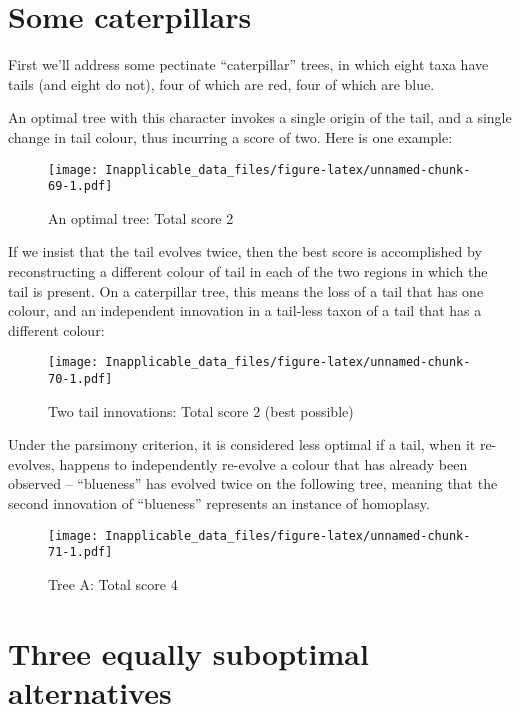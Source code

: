 \documentclass[]{book}
\theoremstyle{definition}
\theoremstyle{definition}
\theoremstyle{definition}
\theoremstyle{remark}
\begin{document}
\hypertarget{some-caterpillars}{%
\section{Some caterpillars}\label{some-caterpillars}}

First we'll address some pectinate ``caterpillar'' trees, in which eight
taxa have tails (and eight do not), four of which are red, four of which
are blue.

An optimal tree with this character invokes a single origin of the tail,
and a single change in tail colour, thus incurring a score of two. Here
is one example:

\begin{figure}
\centering
\texttt{[image: Inapplicable\_data\_files/figure-latex/unnamed-chunk-69-1.pdf]}
\caption{\label{fig:unnamed-chunk-69}An optimal tree: Total score 2}
\end{figure}

If we insist that the tail evolves twice, then the best score is
accomplished by reconstructing a different colour of tail in each of the
two regions in which the tail is present. On a caterpillar tree, this
means the loss of a tail that has one colour, and an independent
innovation in a tail-less taxon of a tail that has a different colour:

\begin{figure}
\centering
\texttt{[image: Inapplicable\_data\_files/figure-latex/unnamed-chunk-70-1.pdf]}
\caption{\label{fig:unnamed-chunk-70}Two tail innovations: Total score 2
(best possible)}
\end{figure}

Under the parsimony criterion, it is considered less optimal if a tail,
when it re-evolves, happens to independently re-evolve a colour that has
already been observed -- ``blueness'' has evolved twice on the following
tree, meaning that the second innovation of ``blueness'' represents an
instance of homoplasy.

\begin{figure}
\centering
\texttt{[image: Inapplicable\_data\_files/figure-latex/unnamed-chunk-71-1.pdf]}
\caption{\label{fig:unnamed-chunk-71}Tree A: Total score 4}
\end{figure}

\hypertarget{three-equally-suboptimal-alternatives}{%
\section{Three equally suboptimal
alternatives}\label{three-equally-suboptimal-alternatives}}
\end{document}
